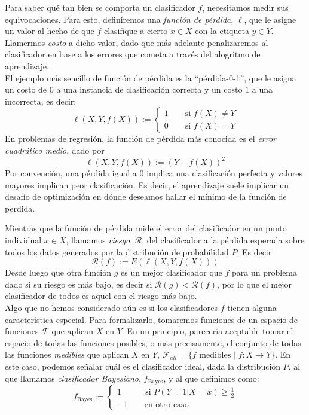 \documentclass{article}
\begin{document}
Para saber qué tan bien se comporta un clasificador $f$, necesitamos medir sus equivocaciones. Para esto, definiremos una \textit{función de pérdida},
$\ell$, que le asigne un valor al hecho de que $f$ clasifique a cierto $x\in X$ con la etiqueta $y\in Y$. Llamermos \textit{costo} a dicho valor, 
dado que más adelante penalizaremos al clasificador en base a los errores que cometa a través del alogritmo de aprendizaje.\\
El ejemplo más sencillo de función de pérdida es la ``pérdida-0-1'', que le asigna un costo de $0$ a una instancia de clasificación correcta y un costo
$1$ a una incorrecta, es decir:
$$
\ell(X,Y,f(X)):= \begin{cases}
    1 \qquad \text{si } f(X) \neq Y \\
    0 \qquad \text{si } f(X) = Y
\end{cases}
$$
En problemas de regresión, la función de pérdida más conocida es el \textit{error cuadrático medio}, dado por
$$
\ell(X,Y,f(X)):= (Y-f(X))^2
$$
Por convención, una pérdida igual a $0$ implica una clasificación perfecta y valores mayores implican peor clasificación. Es decir,
el aprendizaje suele implicar un desafío de optimización en dónde deseamos hallar el mínimo de la función de perdida.

Mientras que la función de pérdida mide el error del clasificador en un punto individual $x\in X$, llamamos \textit{riesgo}, $\mathcal{R}$, 
del clasificador a la pérdida esperada sobre todos los datos generados por la distribución de probabilidad $P$. Es decir
$$
\mathcal{R}(f) := E\left( \ell(X,Y,f(X)) \right)
$$
Desde luego que otra función $g$ es un mejor clasificador que $f$ para un problema dado si su riesgo es más bajo, es decir si $\mathcal{R}(g)
< \mathcal{R}(f)$, por lo que el mejor clasificador de todos es aquel con el riesgo más bajo.\\

Algo que no hemos considerado aún es si los clasificadores $f$ tienen alguna característica especial. Para formalizarlo, tomaremos funciones de un
espacio de funciones $\mathcal{F}$ que aplican $X$ en $Y$. En un principio, parecería aceptable tomar el espacio de todas las funciones posibles, o 
más precisamente, el conjunto de todas las funciones \textit{medibles} que aplican $X$ en $Y$, $\mathcal{F}_{all} = \{f \text{ medibles  } | 
\; f: X \rightarrow Y \}$. En este caso, podemos señalar cuál es el clasificador ideal, dada la distribución $P$, al que llamamos
\textit{clasificador Bayesiano}, $f_{\text{Bayes}}$, y al que definimos como:
$$
f_{\text{Bayes}} := \begin{cases}
1 \qquad \; \; \text{  si } P(Y=1 | X=x) \geq \frac{1}{2}\\
-1 \qquad \text{en otro caso }
\end{cases}
$$
\end{document}
